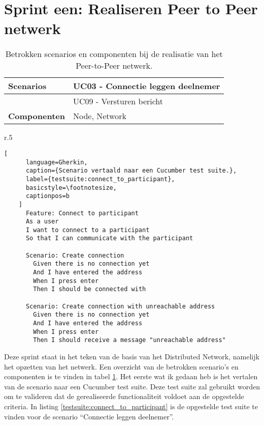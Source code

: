 \section{Sprint een: Realiseren Peer to Peer netwerk}

\begin{table}[ht]
    \begin{tabular}{|p{}|p{}|}
      \hline
      \textbf{Scenarios} & UC03 - Connectie leggen deelnemer \\
      \hline
      & UC09 - Versturen bericht \\
      \hline
      \textbf{Componenten} & Node, Network \\
      \hline
    \end{tabular}
    \caption[Betrokken architectuur onderdelen implementatie Peer-to-Peer netwerk]{Betrokken scenarios en componenten bij de realisatie van het Peer-to-Peer netwerk.}
    \label{realisatie:p2p}
\end{table}

\begin{wrapfigure}[11]{r}{.5\textwidth}
    \begin{lstlisting}[
      language=Gherkin,
      caption={Scenario vertaald naar een Cucumber test suite.},
      label={testsuite:connect_to_participant},
      basicstyle=\footnotesize,
      captionpos=b
    ]
      Feature: Connect to participant
      As a user
      I want to connect to a participant
      So that I can communicate with the participant
  
      Scenario: Create connection
        Given there is no connection yet
        And I have entered the address
        When I press enter
        Then I should be connected with 
  
      Scenario: Create connection with unreachable address
        Given there is no connection yet
        And I have entered the address
        When I press enter
        Then I should receive a message "unreachable address"
    \end{lstlisting}
\end{wrapfigure}

Deze sprint staat in het teken van de basis van het Distributed Network, namelijk het opzetten van het netwerk. Een overzicht van de betrokken scenario's en componenten is te vinden in tabel \ref{realisatie:p2p}. Het eerste wat ik gedaan heb is het vertalen van de scenario naar een Cucumber test suite. Deze test suite zal gebruikt worden om te valideren dat de gerealiseerde functionaliteit voldoet aan de opgestelde criteria. In listing \ref{testsuite:connect_to_participant} is de opgestelde test suite te vinden voor de scenario ``Connectie leggen deelnemer''.

